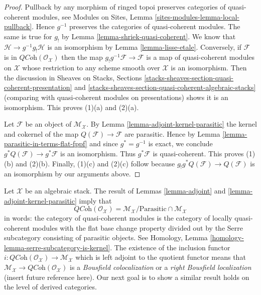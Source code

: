 \begin{proof}
Pullback by any morphism of ringed topoi preserves categories of quasi-coherent
modules, see
Modules on Sites, Lemma \ref{sites-modules-lemma-local-pullback}.
Hence $g^{-1}$ preserves the categories of quasi-coherent modules.
The same is true for $g_!$ by
Lemma \ref{lemma-shriek-quasi-coherent}.
We know that $\mathcal{H} \to g^{-1}g_!\mathcal{H}$ is an isomorphism by
Lemma \ref{lemma-lisse-etale}.
Conversely, if $\mathcal{F}$ is in $\textit{QCoh}(\mathcal{O}_\mathcal{X})$
then the map $g_!g^{-1}\mathcal{F} \to \mathcal{F}$ is a map of quasi-coherent
modules on $\mathcal{X}$ whose restriction to any scheme smooth over
$\mathcal{X}$ is an isomorphism. Then the discussion in
Sheaves on Stacks, Sections
\ref{stacks-sheaves-section-quasi-coherent-presentation} and
\ref{stacks-sheaves-section-quasi-coherent-algebraic-stacks}
(comparing with quasi-coherent modules on presentations)
shows it is an isomorphism. This proves (1)(a) and (2)(a).

\medskip\noindent
Let $\mathcal{F}$ be an object of $\mathcal{M}_\mathcal{X}$. By
Lemma \ref{lemma-adjoint-kernel-parasitic}
the kernel and cokernel of the map
$Q(\mathcal{F}) \to \mathcal{F}$ are parasitic. Hence by
Lemma \ref{lemma-parasitic-in-terms-flat-fppf}
and since $g^* = g^{-1}$ is exact, we conclude
$g^*Q(\mathcal{F}) \to g^*\mathcal{F}$ is an isomorphism. Thus
$g^*\mathcal{F}$ is quasi-coherent. This proves (1)(b) and (2)(b).
Finally, (1)(c) and (2)(c) follow because
$g_!g^*Q(\mathcal{F}) \to Q(\mathcal{F})$ is an isomorphism by
our arguments above.
\end{proof}

\begin{remark}
\label{remark-bousfield-colocalization}
Let $\mathcal{X}$ be an algebraic stack. The result of
Lemmas \ref{lemma-adjoint} and \ref{lemma-adjoint-kernel-parasitic}
imply that
$$
\textit{QCoh}(\mathcal{O}_\mathcal{X}) =
\mathcal{M}_\mathcal{X} / \text{Parasitic} \cap \mathcal{M}_\mathcal{X}
$$
in words: the category of quasi-coherent modules is the category
of locally quasi-coherent modules with the flat base change property
divided out by the Serre subcategory consisting of parasitic objects.
See Homology, Lemma \ref{homology-lemma-serre-subcategory-is-kernel}.
The existence of the inclusion functor
$i : \textit{QCoh}(\mathcal{O}_\mathcal{X}) \to \mathcal{M}_\mathcal{X}$
which is left adjoint to the quotient functor means that
$\mathcal{M}_\mathcal{X} \to \textit{QCoh}(\mathcal{O}_\mathcal{X})$
is a {\it Bousfield colocalization} or a {\it right Bousfield localization}
(insert future reference here). Our next goal is to show a similar result
holds on the level of derived categories.
\end{remark}

